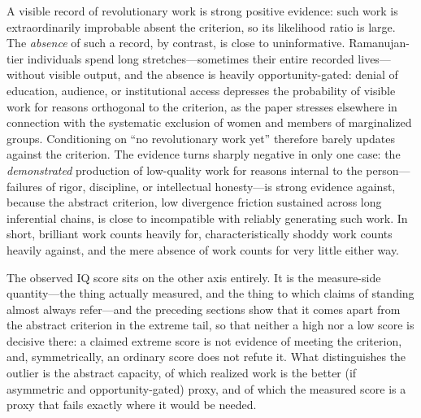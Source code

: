 \documentclass{article}
\begin{document}
A visible record of revolutionary work is strong positive evidence: such work is extraordinarily improbable absent the criterion, so its likelihood ratio is large. The \emph{absence} of such a record, by contrast, is close to uninformative. Ramanujan-tier individuals spend long stretches---sometimes their entire recorded lives---without visible output, and the absence is heavily opportunity-gated: denial of education, audience, or institutional access depresses the probability of visible work for reasons orthogonal to the criterion, as the paper stresses elsewhere in connection with the systematic exclusion of women and members of marginalized groups. Conditioning on ``no revolutionary work yet'' therefore barely updates against the criterion. The evidence turns sharply negative in only one case: the \emph{demonstrated} production of low-quality work for reasons internal to the person---failures of rigor, discipline, or intellectual honesty---is strong evidence against, because the abstract criterion, low divergence friction sustained across long inferential chains, is close to incompatible with reliably generating such work. In short, brilliant work counts heavily for, characteristically shoddy work counts heavily against, and the mere absence of work counts for very little either way.

The observed IQ score sits on the other axis entirely. It is the measure-side quantity---the thing actually measured, and the thing to which claims of standing almost always refer---and the preceding sections show that it comes apart from the abstract criterion in the extreme tail, so that neither a high nor a low score is decisive there: a claimed extreme score is not evidence of meeting the criterion, and, symmetrically, an ordinary score does not refute it. What distinguishes the outlier is the abstract capacity, of which realized work is the better (if asymmetric and opportunity-gated) proxy, and of which the measured score is a proxy that fails exactly where it would be needed.
\end{document}
